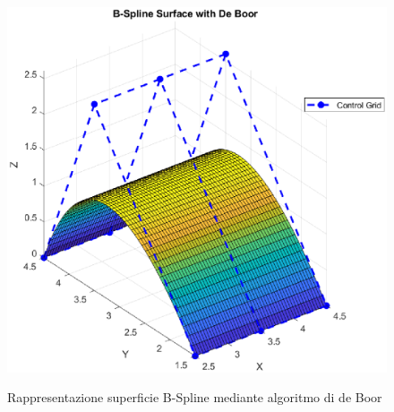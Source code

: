 \documentclass[a4paper, 12pt]{article}
\begin{document}



\begin{figure}[h!]
	\centering
	\caption{Rappresentazione superficie B-Spline mediante algoritmo di de Boor}
	\includegraphics[scale=0.7]{surface_de_boor_plot.eps}
	\label{fig:BSpline_surface_DeBoor}
\end{figure}
\end{document}
